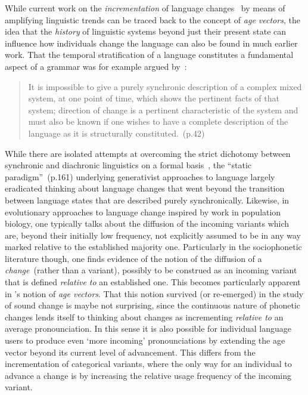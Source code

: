 While current work on the \emph{incrementation} of language changes~\citep[see][ch.14 in particular]{Labov2001} by means of amplifying linguistic trends can be traced back to the concept of \emph{age vectors}, the idea that the \emph{history} of linguistic systems beyond just their present state can influence how individuals change the language can also be found in much earlier work. %
That the temporal stratification of a language constitutes a fundamental aspect of a grammar was for example argued by~\citet{Fries1949}:

\begin{quote}
It is impossible to give a purely synchronic description of a complex mixed system, at one point of time, which shows the pertinent facts of that system; direction of change is a pertinent characteristic of the system and must also be known if one wishes to have a complete description of the language as it is structurally constituted.~(p.42)
\end{quote}

While there are isolated attempts at overcoming the strict dichotomy between synchronic and diachronic linguistics on a formal basis~\citep[e.g.][]{Bailey1970}, the ``static paradigm''~(p.161) underlying generativist approaches to language largely eradicated thinking about language changes that went beyond the transition between language states that are described purely synchronically.
Likewise, in evolutionary approaches to language change inspired by work in population biology, one typically talks about the diffusion of the incoming variants which are, beyond their initially low frequency, not explicitly assumed to be in any way marked relative to the established majority one.
Particularly in the sociophonetic literature though, one finds evidence of the notion of the diffusion of a \emph{change}~(rather than a variant), possibly to be construed as an incoming variant that is defined \emph{relative to} an established one. This becomes particularly apparent in \citet{Labov2001}'s notion of \emph{age vectors}. 
That this notion survived (or re-emerged) in the study of sound change is maybe not surprising, since the continuous nature of phonetic changes lends itself to thinking about changes as incrementing \emph{relative to} an average pronounciation. In this sense it is also possible for individual language users to produce even `more incoming' pronounciations by extending the age vector beyond its current level of advancement. This differs from the incrementation of categorical variants, where the only way for an individual to advance a change is by increasing the relative usage frequency of the incoming variant.

